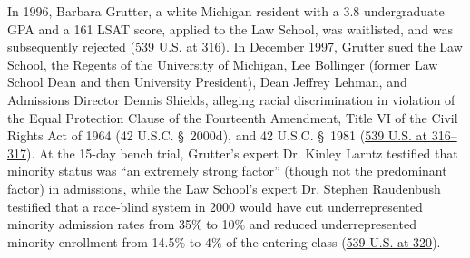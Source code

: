 \documentclass[12pt]{article}
\begin{document}
In 1996, Barbara Grutter, a white Michigan resident with a 3.8 undergraduate GPA and a 161 LSAT score, applied to the Law School, was waitlisted, and was subsequently rejected (\href{https://supreme.justia.com/cases/federal/us/539/306/}{539 U.S. at 316}). In December 1997, Grutter sued the Law School, the Regents of the University of Michigan, Lee Bollinger (former Law School Dean and then University President), Dean Jeffrey Lehman, and Admissions Director Dennis Shields, alleging racial discrimination in violation of the Equal Protection Clause of the Fourteenth Amendment, Title VI of the Civil Rights Act of 1964 (42 U.S.C. \S~2000d), and 42 U.S.C. \S~1981 (\href{https://supreme.justia.com/cases/federal/us/539/306/}{539 U.S. at 316--317}). At the 15-day bench trial, Grutter's expert Dr. Kinley Larntz testified that minority status was ``an extremely strong factor'' (though not the predominant factor) in admissions, while the Law School's expert Dr. Stephen Raudenbush testified that a race-blind system in 2000 would have cut underrepresented minority admission rates from 35\% to 10\% and reduced underrepresented minority enrollment from 14.5\% to 4\% of the entering class (\href{https://supreme.justia.com/cases/federal/us/539/306/}{539 U.S. at 320}).
\end{document}
